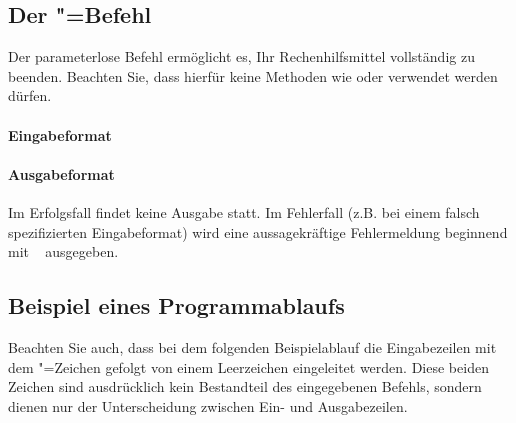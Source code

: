 \documentclass{sdqassignment}
\begin{document}
\subsection{Der "=Befehl}
Der parameterlose Befehl ermöglicht es, Ihr Rechenhilfsmittel vollständig zu beenden. Beachten Sie, dass hierfür keine Methoden wie  oder  verwendet werden dürfen.
\paragraph*{Eingabeformat}
\paragraph*{Ausgabeformat}
Im Erfolgsfall findet keine Ausgabe statt. Im Fehlerfall (z.B. bei einem falsch spezifizierten Eingabeformat) wird eine aussagekräftige Fehlermeldung beginnend mit \textvisiblespace~ ausgegeben.
\subsection{Beispiel eines Programmablaufs}
Beachten Sie auch, dass bei dem folgenden Beispielablauf die Eingabezeilen mit dem \lstinlinetxt{>}"=Zeichen gefolgt von einem Leerzeichen eingeleitet werden. Diese beiden Zeichen sind ausdrücklich kein Bestandteil des eingegebenen Befehls, sondern dienen nur der Unterscheidung zwischen Ein- und Ausgabezeilen.


\end{document}
